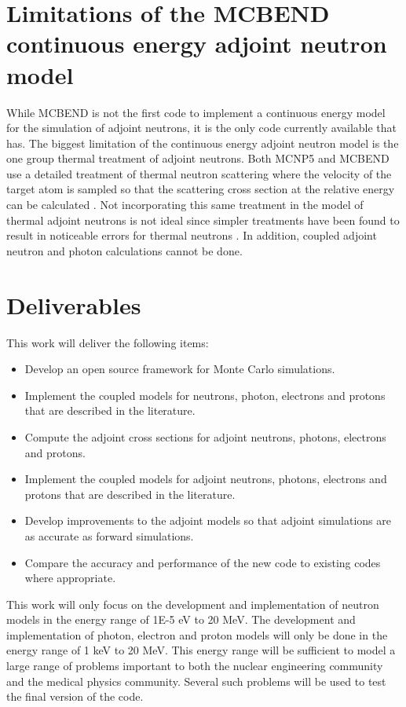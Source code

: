 \documentclass[letterpaper,12pt]{article}
\begin{document}
\section{Limitations of the MCBEND continuous energy adjoint neutron model}
While MCBEND is not the first code to implement a continuous energy model for the simulation of adjoint neutrons, it is the only code currently available that has. The biggest limitation of the continuous energy adjoint neutron model is the one group thermal treatment of adjoint neutrons. Both MCNP5 and MCBEND use a detailed treatment of thermal neutron scattering where the velocity of the target atom is sampled so that the scattering cross section at the relative energy can be calculated \cite{grimstone_extension_1998}. Not incorporating this same treatment in the model of thermal adjoint neutrons is not ideal since simpler treatments have been found to result in noticeable errors for thermal neutrons \cite{x-5_monte_carlo_team_mcnp_2003}. In addition, coupled adjoint neutron and photon calculations cannot be done.

\section{Deliverables}
This work will deliver the following items:
\begin{itemize}
  \item Develop an open source framework for Monte Carlo simulations.
  \item Implement the coupled models for neutrons, photon, electrons and protons that are described in the literature.
  \item Compute the adjoint cross sections for adjoint neutrons, photons, electrons and protons.
  \item Implement the coupled models for adjoint neutrons, photons, electrons and protons that are described in the literature.
  \item Develop improvements to the adjoint models so that adjoint simulations are as accurate as forward simulations.
  \item Compare the accuracy and performance of the new code to existing codes where appropriate.
\end{itemize}
    
This work will only focus on the development and implementation of neutron models in the energy range of 1E-5 eV to 20 MeV. The development and implementation of photon, electron and proton models will only be done in the energy range of 1 keV to 20 MeV. This energy range will be sufficient to model a large range of problems important to both the nuclear engineering community and the medical physics community. Several such problems will be used to test the final version of the code. 
\end{document}
